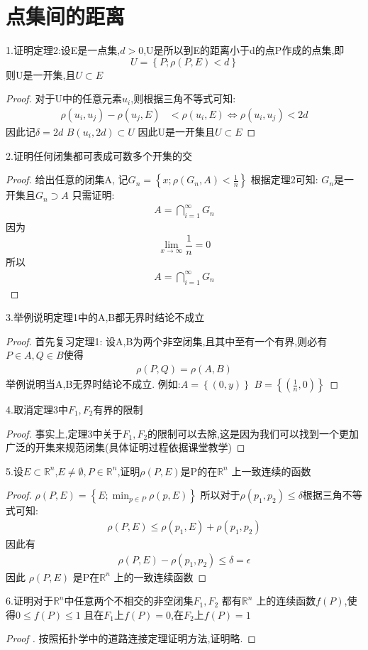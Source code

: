 \section{点集间的距离}
1.证明定理2:设E是一点集,\(d >0\),U是所以到E的距离小于d的点P作成的点集,即\[U = \left\{P ; \rho(P,E)<d \right\}\]
则U是一开集,且\(U\subset E \)
\begin{proof}
  对于U中的任意元素\(u_i\),则根据三角不等式可知: 
  \begin{align*}
    \rho(u_i, u_j) - \rho(u_j ,E) &< \rho(u_i,E)
    \Leftrightarrow 
    \rho(u_i,u_j) < 2d 
  \end{align*}
  因此记\(\delta =2d \) \(B(u_i ,2d)\subset U \)
  因此U是一开集且\(U \subset E \)
\end{proof}
2.证明任何闭集都可表成可数多个开集的交
\begin{proof}
  给出任意的闭集A,
  记\(G_n =\left\{x ; \rho(G_n,A)<\frac{1}{n}\right\}\)
  根据定理2可知: \(G_n \)是一开集且\(G_n \supset A\)
  只需证明: \begin{align*}
    A = \bigcap\limits_{i=1}^{\infty} G_n 
  \end{align*}
  因为\[\lim_{x \rightarrow \infty } \frac{1}{n}= 0 \]
  所以\begin{align*}
    A = \bigcap\limits_{i=1}^{\infty} G_n
  \end{align*}
\end{proof}
3.举例说明定理1中的A,B都无界时结论不成立
\begin{proof}
  首先复习定理1: 设A,B为两个非空闭集,且其中至有一个有界,则必有\(P \in A ,Q\in B \)使得\begin{align*}
    \rho(P,Q)=\rho(A,B)
  \end{align*} 
  举例说明当A,B无界时结论不成立.
  例如:\(A= \left\{(0,y)\right\}\) \(B =\left\{(\frac{1}{n},0)\right\}\)
\end{proof}
4.取消定理3中\(F_1,F_2 \)有界的限制
\begin{proof}
  事实上,定理3中关于\(F_1 ,F_2\)的限制可以去除,这是因为我们可以找到一个更加广泛的开集来规范闭集(具体证明过程依据课堂教学) 
\end{proof}
5.设\(E \subset \mathbb{R}^n\),\(E \neq \emptyset , P\in \mathbb{R}^n\),证明\(\rho(P,E)\)是P的在\(\mathbb
{R}^n \) 上一致连续的函数
\begin{proof}
  \(\rho(P,E) = \left\{E ; \min_{p \in P } \rho(p,E)\right\}\) 
  所以对于\(\rho(p_1,p_2) \leq \delta \)根据三角不等式可知:
  \begin{align*}
    \rho(P,E) \leq \rho(p_1 ,E) +\rho(p_1,p_2) 
  \end{align*}
  因此有
  \begin{align*}
    \rho(P,E) - \rho(p_1,p_2) \leq \delta = \epsilon
  \end{align*}
  因此 \(\rho(P,E)\) 是P在\(\mathbb{R}^n \) 上的一致连续函数
\end{proof}
6.证明对于\(\mathbb{R}^n \)中任意两个不相交的非空闭集\(F_1 ,F_2\) 都有\(\mathbb{R}^n \) 上的连续函数\(f(P)\),使得\(0\leq f(P) \leq 1 \) 且在\(F_1\)上\(f(P)=0\),在\(F_2\)上\(f(P)=1\)
\begin{proof}[Proof ]
  按照拓扑学中的道路连接定理证明方法,证明略.
\end{proof}
